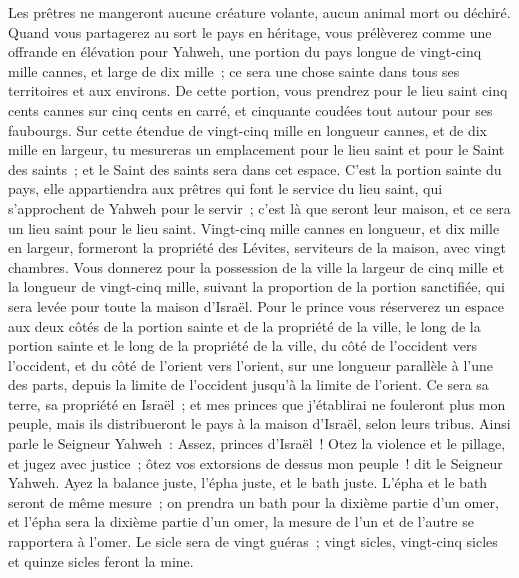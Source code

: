 \begin{multicols}{2}
Les prêtres ne mangeront aucune créature volante, aucun animal mort ou déchiré.
\VerseOne{}Quand vous partagerez au sort le pays en héritage, vous prélèverez comme une offrande en élévation pour Yahweh, une portion du pays longue de vingt-cinq mille cannes, et large de dix mille~; ce sera une chose sainte dans tous ses territoires et aux environs.
De cette portion, vous prendrez pour le lieu saint cinq cents cannes sur cinq cents en carré, et cinquante coudées tout autour pour ses faubourgs.
Sur cette étendue de vingt-cinq mille en longueur cannes, et de dix mille en largeur, tu mesureras un emplacement pour le lieu saint et pour le Saint des saints~; et le Saint des saints sera dans cet espace.
C'est la portion sainte du pays, elle appartiendra aux prêtres qui font le service du lieu saint, qui s'approchent de Yahweh pour le servir~; c'est là que seront leur maison, et ce sera un lieu saint pour le lieu saint.
Vingt-cinq mille cannes en longueur, et dix mille en largeur, formeront la propriété des Lévites, serviteurs de la maison, avec vingt chambres.
Vous donnerez pour la possession de la ville la largeur de cinq mille et la longueur de vingt-cinq mille, suivant la proportion de la portion sanctifiée, qui sera levée pour toute la maison d'Israël.
Pour le prince vous réserverez un espace aux deux côtés de la portion sainte et de la propriété de la ville, le long de la portion sainte et le long de la propriété de la ville, du côté de l'occident vers l'occident, et du côté de l'orient vers l'orient, sur une longueur parallèle à l'une des parts, depuis la limite de l'occident jusqu'à la limite de l'orient.
Ce sera sa terre, sa propriété en Israël~; et mes princes que j'établirai ne fouleront plus mon peuple, mais ils distribueront le pays à la maison d'Israël, selon leurs tribus.
Ainsi parle le Seigneur Yahweh~: Assez, princes d'Israël~! Otez la violence et le pillage, et jugez avec justice~; ôtez vos extorsions de dessus mon peuple~! dit le Seigneur Yahweh.
Ayez la balance juste, l'épha juste, et le bath juste.
L'épha et le bath seront de même mesure~; on prendra un bath pour la dixième partie d'un omer, et l'épha sera la dixième partie d'un omer, la mesure de l'un et de l'autre se rapportera à l'omer.
Le sicle sera de vingt guéras~; vingt sicles, vingt-cinq sicles et quinze sicles feront la mine.

\end{multicols}
